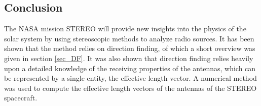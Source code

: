 \documentclass[galley,ras]{agu2001}
\begin{document}
\begin{article}
\section{Conclusion}
The NASA mission STEREO will provide new insights into the physics of the solar system by using stereoscopic methods to analyze radio sources. It has been shown that the method relies on direction finding, of which a short overview was given in section \ref{sec_DF}. It was also shown that direction finding relies heavily upon a detailed knowledge of the receiving properties of the antennas, which can be represented by a single entity, the effective length vector. A numerical method was used to compute the effective length vectors of the antennas of the STEREO spacecraft. \\
%


%
%








\end{article}
\end{document}
